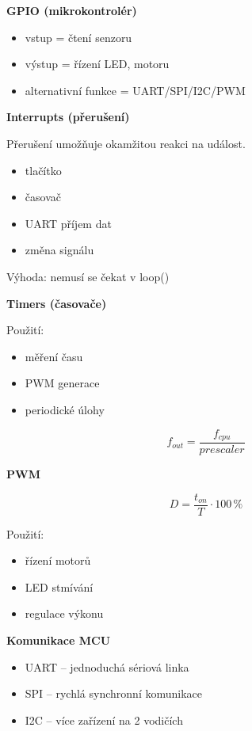 \documentclass[a4paper,10pt]{article}
\begin{document}
\begin{vysvetlenibox}
\textbf{GPIO (mikrokontrolér)}

\begin{itemize}
\item vstup = čtení senzoru
\item výstup = řízení LED, motoru
\item alternativní funkce = UART/SPI/I2C/PWM
\end{itemize}

\textbf{Interrupts (přerušení)}

Přerušení umožňuje okamžitou reakci na událost.

\begin{itemize}
\item tlačítko
\item časovač
\item UART příjem dat
\item změna signálu
\end{itemize}

 Výhoda: nemusí se čekat v loop()

\textbf{Timers (časovače)}

Použití:
\begin{itemize}
\item měření času
\item PWM generace
\item periodické úlohy
\end{itemize}

\[
f_{out} = \frac{f_{cpu}}{prescaler}
\]

\textbf{PWM}

\begin{vzorcebox}
\[
D = \frac{t_{on}}{T} \cdot 100\,\%
\]
\end{vzorcebox}

Použití:
\begin{itemize}
\item řízení motorů
\item LED stmívání
\item regulace výkonu
\end{itemize}

\textbf{Komunikace MCU}

\begin{itemize}
\item UART – jednoduchá sériová linka
\item SPI – rychlá synchronní komunikace
\item I2C – více zařízení na 2 vodičích
\end{itemize}


\end{vysvetlenibox}
\end{document}
